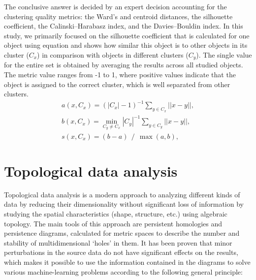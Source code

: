 \documentclass[10pt]{iopart}
\begin{document}
The conclusive answer is decided by an expert decision accounting for the clustering quality metrics: the Ward's and centroid distances, the silhouette coefficient, the Calinski--Harabasz index, and the Davies--Bouldin index. In this study, we primarily focused on the silhouette coefficient that is calculated for one object using equation  and shows how similar this object is to other objects in its cluster ($C_x$) in comparison with objects in different clusters ($C_y$). The single value for the entire set is obtained by averaging the results across all studied objects. The metric value ranges from -1 to 1, where positive values indicate that the object is assigned to the correct cluster, which is well separated from other clusters.
\begin{eqnarray}
    a(x, C_x) = {(|C_x| - 1)} ^ {-1} \sum_{y \in C_x} ||x - y||, \nonumber\\
    b(x, C_x) = \min_{C_y \ne C_x} {|C_y|} ^ {-1} \sum_{y \in C_y} ||x - y||, \nonumber\\
    s(x, C_x) = (b - a)~~/~~\max(a, b), \label{eq1}
\end{eqnarray}

\section{Topological data analysis}

Topological data analysis is a modern approach to analyzing different kinds of data by reducing their dimensionality without significant loss of information by studying the spatial characteristics (shape, structure, etc.) using algebraic topology. The main tools of this approach are persistent homologies and persistence diagrams, calculated for metric spaces to describe the number and stability of multidimensional `holes' in them. It has been proven that minor perturbations in the source data do not have significant effects on the results, which makes it possible to use the information contained in the diagrams to solve various machine-learning problems according to the following general principle:
\end{document}
